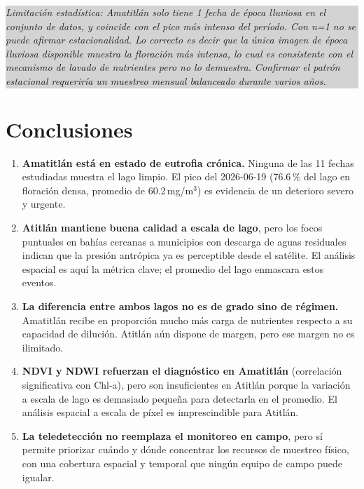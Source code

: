 \documentclass[12pt, a4paper]{article}
\newcommand{\mgm}{\,mg/m$^3$}
\newcommand{\nota}[1]{\vspace{2pt}\noindent\colorbox{lightgray}{\parbox{\dimexpr\linewidth-2\fboxsep\relax}{\small\textit{#1}}}\vspace{4pt}}
\begin{document}
\nota{Limitación estadística: Amatitlán solo tiene 1 fecha de época lluviosa en el conjunto de
datos, y coincide con el pico más intenso del período. Con n=1 no se puede afirmar estacionalidad.
Lo correcto es decir que la única imagen de época lluviosa disponible muestra la floración más
intensa, lo cual es consistente con el mecanismo de lavado de nutrientes pero no lo demuestra.
Confirmar el patrón estacional requeriría un muestreo mensual balanceado durante varios años.}

\section{Conclusiones}

\begin{enumerate}[leftmargin=1.5em]
  \item \textbf{Amatitlán está en estado de eutrofia crónica.} Ninguna de las 11 fechas
        estudiadas muestra el lago limpio. El pico del 2026-06-19 (76.6\,\% del lago en
        floración densa, promedio de 60.2\mgm) es evidencia de un deterioro severo y urgente.

  \item \textbf{Atitlán mantiene buena calidad a escala de lago}, pero los focos puntuales
        en bahías cercanas a municipios con descarga de aguas residuales indican que la
        presión antrópica ya es perceptible desde el satélite. El análisis espacial es
        aquí la métrica clave; el promedio del lago enmascara estos eventos.

  \item \textbf{La diferencia entre ambos lagos no es de grado sino de régimen.} Amatitlán
        recibe en proporción mucho más carga de nutrientes respecto a su capacidad de dilución.
        Atitlán aún dispone de margen, pero ese margen no es ilimitado.

  \item \textbf{NDVI y NDWI refuerzan el diagnóstico en Amatitlán} (correlación significativa
        con Chl-a), pero son insuficientes en Atitlán porque la variación a escala de lago es
        demasiado pequeña para detectarla en el promedio. El análisis espacial a escala de píxel
        es imprescindible para Atitlán.

  \item \textbf{La teledetección no reemplaza el monitoreo en campo}, pero sí permite priorizar
        cuándo y dónde concentrar los recursos de muestreo físico, con una cobertura espacial y
        temporal que ningún equipo de campo puede igualar.
\end{enumerate}
\end{document}
